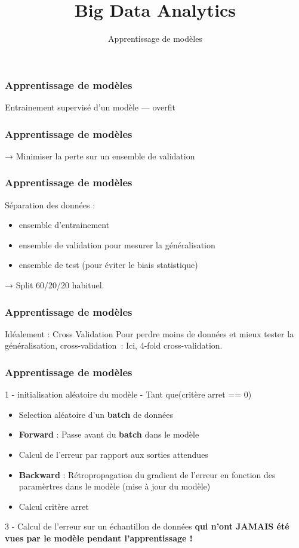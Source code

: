 \documentclass{formation}
\title{Big Data Analytics}
\subtitle{Apprentissage de modèles}
\begin{document}
\maketitle

\begin{frame}
  \frametitle{Apprentissage de modèles}
  Entrainement supervisé d'un modèle — overfit
\end{frame}

\begin{frame}
  \frametitle{Apprentissage de modèles}
  → Minimiser la perte sur un ensemble de validation
\end{frame}

\begin{frame}
  \frametitle{Apprentissage de modèles}
  Séparation des données :
  \begin{itemize}
  \item ensemble d'entrainement
  \item ensemble de validation pour mesurer la généralisation
  \item ensemble de test (pour éviter le biais statistique)
  \end{itemize}
  → Split 60/20/20 habituel.
\end{frame}

\begin{frame}
  \frametitle{Apprentissage de modèles}
  Idéalement : Cross Validation
  Pour \og perdre\fg{} moins de données et mieux tester la
  généralisation, cross-validation :
  Ici, 4-fold cross-validation.
\end{frame}

\begin{frame}
  \frametitle{Apprentissage de modèles}
  1 - initialisation aléatoire du modèle
   - Tant que(critère arret == 0)
  \begin{itemize}
  \item Selection aléatoire d'un \textbf{batch} de données
  \item \textbf{Forward} : Passe avant du \textbf{batch} dans le modèle
  \item Calcul de l'erreur par rapport aux sorties attendues
  \item \textbf{Backward} : Rétropropagation du gradient de l'erreur en fonction des paramèrtres dans le modèle (mise à jour du modèle)
  \item Calcul critère arret
  \end{itemize}
  3 - Calcul de l'erreur sur un échantillon de données  \textbf{qui n'ont JAMAIS été vues par le modèle pendant l'apprentissage !}
\end{frame}
\end{document}
